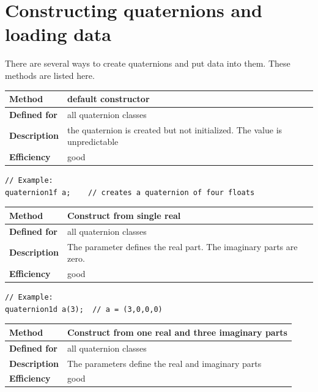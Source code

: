 \documentclass[11pt,a4paper,oneside,openright]{report}
\newcommand{\vspacesmall}{\vspace{3mm}}
\newcommand{\vspacebig}{\vspace{6mm}}
\begin{document}
\chapter{Constructing quaternions and loading data} 
\label{ConstructingQuaternions}

There are several ways to create quaternions and put data into them. These methods are listed here.
\vspacebig

\begin{tabular}{|p{25mm}|p{100mm}|}
\hline
\bfseries Method & default constructor \\ \hline
\bfseries Defined for & all quaternion classes \\ \hline
\bfseries Description & the quaternion is created but not initialized.\newline
The value is unpredictable \\ \hline
\bfseries Efficiency & good \\ \hline
\end{tabular}
\vspacesmall

\begin{lstlisting}[frame=none]
// Example:
quaternion1f a;    // creates a quaternion of four floats
\end{lstlisting}
\vspacebig


\begin{tabular}{|p{25mm}|p{100mm}|}
\hline
\bfseries Method & Construct from single real \\ \hline
\bfseries Defined for & all quaternion classes \\ \hline
\bfseries Description & The parameter defines the real part. The imaginary parts are zero. \\ \hline
\bfseries Efficiency & good \\ \hline
\end{tabular}
\vspacesmall

\begin{lstlisting}[frame=none]
// Example:
quaternion1d a(3);  // a = (3,0,0,0)
\end{lstlisting}
\vspacebig


\begin{tabular}{|p{25mm}|p{100mm}|}
\hline
\bfseries Method & Construct from one real and three imaginary parts \\ \hline
\bfseries Defined for & all quaternion classes \\ \hline
\bfseries Description & The parameters define the real and imaginary parts  \\ \hline
\bfseries Efficiency & good \\ \hline
\end{tabular}
\vspacesmall
\end{document}
